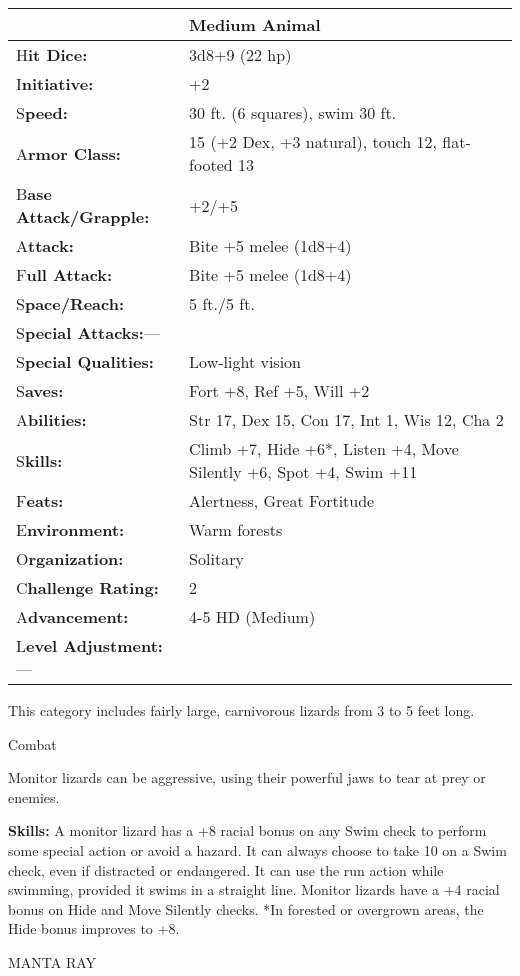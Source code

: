 \documentclass{article}
\begin{document}
\begin{tabular}{|>{\raggedright}p{81pt}|>{\raggedright}p{245pt}|}
\hline
  & Medium Animal\tabularnewline
\hline
H\textbf{it Dice:} & 3d8+9 (22 hp)\tabularnewline
\hline
I\textbf{nitiative:} & +2\tabularnewline
\hline
S\textbf{peed:} & 30 ft. (6 squares), swim 30 ft.\tabularnewline
\hline
A\textbf{rmor Class:} & 15 (+2 Dex, +3 natural), touch 12, flat-footed 13\tabularnewline
\hline
B\textbf{ase Attack/Grapple:} & +2/+5\tabularnewline
\hline
A\textbf{ttack:} & Bite +5 melee (1d8+4)\tabularnewline
\hline
F\textbf{ull Attack:} & Bite +5 melee (1d8+4)\tabularnewline
\hline
S\textbf{pace/Reach:} & 5 ft./5 ft.\tabularnewline
\hline
S\textbf{pecial Attacks:}--- & \tabularnewline
\hline
S\textbf{pecial Qualities:} & Low-light vision\tabularnewline
\hline
S\textbf{aves:} & Fort +8, Ref +5, Will +2\tabularnewline
\hline
A\textbf{bilities:} & Str 17, Dex 15, Con 17, Int 1, Wis 12, Cha 2\tabularnewline
\hline
S\textbf{kills:} & Climb +7, Hide +6*, Listen +4, Move Silently +6, Spot +4, Swim 
+11\tabularnewline
\hline
F\textbf{eats:} & Alertness, Great Fortitude\tabularnewline
\hline
E\textbf{nvironment:} & Warm forests\tabularnewline
\hline
O\textbf{rganization:} & Solitary\tabularnewline
\hline
C\textbf{hallenge Rating:} & 2\tabularnewline
\hline
A\textbf{dvancement:} & 4-5 HD (Medium)\tabularnewline
\hline
L\textbf{evel Adjustment:}--- & \tabularnewline
\hline
\end{tabular}

This category includes fairly large, carnivorous lizards from 3 to 5 feet long.

Combat

Monitor lizards can be aggressive, using their powerful jaws to tear at prey or 
enemies.

\textbf{Skills:} A monitor lizard has a +8 racial bonus on any Swim check to perform 
some special action or avoid a hazard. It can always choose to take 10 on a Swim 
check, even if distracted or endangered. It can use the run action while swimming, 
provided it swims in a straight line. Monitor lizards have a +4 racial bonus on 
Hide and Move Silently checks. *In forested or overgrown areas, the Hide bonus 
improves to +8.

\vspace{12pt}
MANTA RAY
\end{document}
